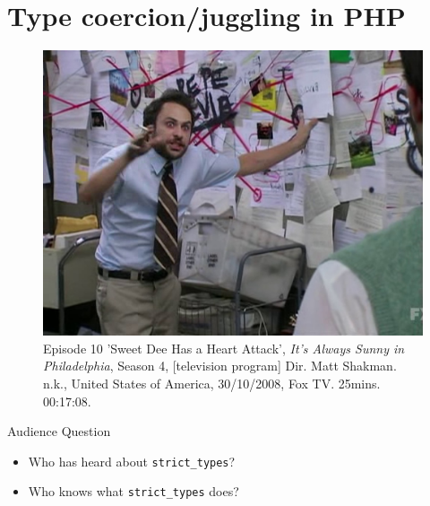 \documentclass[aspectratio=169]{beamer}
\begin{document}
\section{Type coercion/juggling in PHP}
\begin{frame}[plain]
    \begin{figure}[h]
    \centering
    \includegraphics[height=0.75\paperheight]{images/pepe-silvia_1280.jpg}
    \caption{Episode 10 'Sweet Dee Has a Heart Attack', \emph{It's Always Sunny in Philadelphia}, Season 4, [television program] Dir. Matt Shakman. n.k., United States of America, 30/10/2008, Fox TV. 25mins. 00:17:08.}
    \end{figure}
\end{frame}
\begin{frame}{Audience Question}
    \begin{itemize}
        \item<2> Who has heard about \texttt{strict\_types}?
        \item<3> Who \alert{knows} what \texttt{strict\_types} does?
    \end{itemize}
\end{frame}
\end{document}
